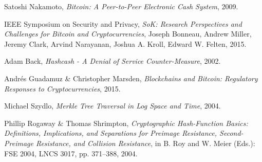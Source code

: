 %
%
%
\begin{thebibliography}{1}

  Satoshi Nakamoto,
  \emph{Bitcoin: A Peer-to-Peer Electronic Cash System},
  2009.



  IEEE Symposium on Security and Privacy,
  \emph{SoK: Research Perspectives and Challenges for Bitcoin and
Cryptocurrencies},
  Joseph Bonneau, Andrew Miller, Jeremy Clark, Arvind Narayanan, Joshua
A. Kroll, Edward W. Felten,
  2015.



  Adam Back,
  \emph{Hashcash - A Denial of Service Counter-Measure},
  2002.

  Andrés Guadamuz \& Christopher Marsden,
  \emph{Blockchains and Bitcoin: Regulatory Responses to Cryptocurrencies},
  2015.



  Michael Szydlo,
  \emph{Merkle Tree Traversal in Log Space and Time},
  2004.


  Phillip Rogaway \& Thomas Shrimpton,
  \emph{Cryptographic Hash-Function Basics: Definitions, Implications, and
Separations for Preimage Resistance, Second-Preimage Resistance, and Collision
Resistance},
  in B. Roy and W. Meier (Eds.): FSE 2004, LNCS 3017, pp. 371–388,
  2004.

\end{thebibliography}
